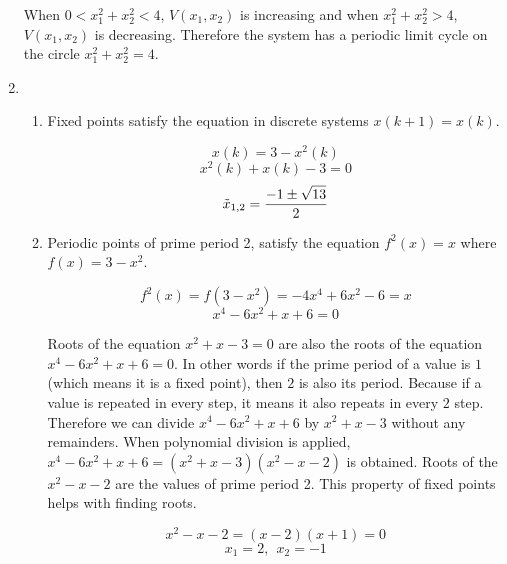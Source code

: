 \documentclass[12pt,a4paper, margin=1in]{article}
\begin{document}
\begin{enumerate}
        When $0 < x_1^2+x_2^2 < 4$, $V(x_1, x_2)$ is increasing and when $x_1^2+x_2^2 > 4$, $V(x_1, x_2)$ is decreasing.
        Therefore the system has a periodic limit cycle on the circle $x_1^2 + x_2^2 = 4$.
        
    \item %
        \begin{enumerate}
            \item 
                Fixed points satisfy the equation in discrete systems $x(k+1)=x(k)$.

                \begin{equation*}
                    x(k) = 3-x^2(k) 
                \end{equation*}
                \begin{equation*}
                    x^2(k) + x(k) - 3 = 0 
                \end{equation*}
                \begin{equation*}
                    \tilde{x}_{1,2} = \frac{\displaystyle -1 \pm \sqrt{13}}{\displaystyle 2}
                \end{equation*}
            \item 
                Periodic points of prime period 2, satisfy the equation $f^2(x) = x$ where $f(x) = 3 - x^2$.

                \begin{equation*}
                    f^2(x) = f(3-x^2) = -4x^4 + 6x^2 - 6 = x
                \end{equation*}
                \begin{equation*}
                    x^4-6x^2+x+6=0
                \end{equation*}

                Roots of the equation $x^2+x-3=0$ are also the roots of the equation $x^4-6x^2+x+6=0$. In other words
                if the prime period of a value is $1$ (which means it is a fixed point), then $2$ is also its period.
                Because if a value is repeated in every step, it means it also repeats in every $2$ step. Therefore 
                we can divide $x^4-6x^2+x+6$ by $x^2+x-3$ without any remainders. When polynomial division is applied,
                $x^4-6x^2+x+6 = (x^2+x-3)(x^2-x-2)$ is obtained. Roots of the $x^2-x-2$ are the values of prime period 2. This 
                property of fixed points helps with finding roots.

                \begin{equation*}
                    x^2-x-2 = (x-2)(x+1) = 0
                \end{equation*}
                \begin{equation*}
                    x_1 = 2, \ \ x_2 = -1
                \end{equation*}
                

\end{enumerate}
\end{enumerate}
\end{document}
